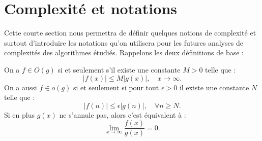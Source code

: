 \documentclass[a4paper]{article} %
\numberwithin{section}{part}
\numberwithin{equation}{section}
\begin{document}
\section{Complexité et notations}
Cette courte section nous permettra de définir quelques notions de complexité
et surtout d'introduire les notations qu'on utilisera pour les futures analyses
de complexités des algorithmes étudiés. Rappelons les deux définitions de base :

\begin{defn}
On a $f\in O(g)$ si et seulement s'il existe une constante $M>0$ telle que :
\begin{equation}
    \vert{f(x)}\vert \leq M\vert{g(x)}\vert,\quad x\to\infty.
\end{equation}
On a aussi $f\in o(g)$ si et seulement si pour tout $\epsilon>0$ il existe une 
constante $N$ telle que :
\begin{equation}
    \vert{f(n)}\vert\leq\epsilon\vert{g(n)}\vert,\quad\forall n\geq N.
\end{equation}
Si en plus $g(x)$ ne s'annule pas, alors c'est équivalent à :
\begin{equation}
    \lim_{x\to\infty}{\frac{f(x)}{g(x)}} = 0.
\end{equation}
\end{defn}
\end{document}

